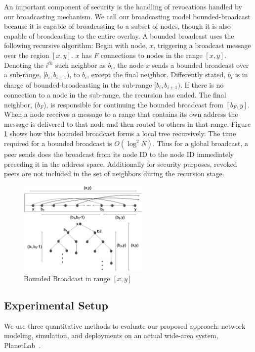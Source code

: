 \documentclass[conference]{IEEEtran}
\begin{document}
An important component of security is the handling of revocations handled by our
broadcasting mechanism.  We call our broadcasting model bounded-broadcast
because it is capable of broadcasting to a subset of nodes, though it is also capable
of broadcasting to the entire overlay.  A bounded broadcast uses the following
recursive algorithm:  Begin with node, $x$, triggering a broadcast message over
the region $[x, y]$.  $x$ has $F$ connections to nodes in the range $[x, y]$.
Denoting the $i^{th}$ such neighbor as $b_i$, the node $x$ sends a bounded
broadcast over a sub-range, $[b_i, b_{i+1})$, to $b_i$, except the final
neighbor.  Differently stated, $b_i$ is in charge of bounded-broadcasting 
in the sub-range $[b_i, b_{i+1})$. If there is no connection to a node in the
sub-range, the recursion has ended.  The final neighbor, ($b_F$), is responsible
for continuing the bounded broadcast from $[b_F, y]$.  When a node receives a
message to a range that contains its own address the message is delivered to
that node and then routed to others in that range.  Figure \ref{fig:tree} shows
how this bounded broadcast forms a local tree recursively.   The time required
for a bounded broadcast is $O(\log^2 N)$.  Thus for a global broadcast, a peer
sends does the broadcast from its node ID to the node ID immediately preceding it
in the address space.  Additionally for security purposes, revoked peers
are not included in the set of neighbors during the recursion stage.

\begin{figure}[!h]
\centering
\includegraphics[width=2.5in]{tree}
\caption{Bounded Broadcast in range $[x, y]$}
\label{fig:tree}
\end{figure}

\subsection{Experimental Setup}
We use three quantitative methods to evaluate our proposed approach: network
modeling, simulation, and deployments on an actual wide-area system,
PlanetLab~\cite{planetlab}.
\end{document}
